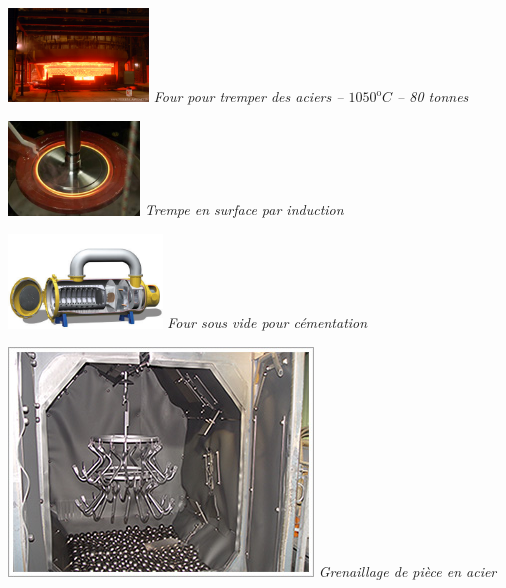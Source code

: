 \documentclass[11pt,oneside]{article}
\begin{document}
\begin{minipage}[c]{.2\linewidth}
\begin{center}
\includegraphics[height=2.5cm]{png/four}
\textit{Four pour tremper des aciers -- $1050^{\text{o}}C$ -- 80 tonnes \cite{four}}
\end{center}
\end{minipage} \hfill
\begin{minipage}[c]{.2\linewidth}
\begin{center}
\includegraphics[height=2.5cm]{png/induction}
\textit{Trempe en surface par induction \cite{induction}}
\end{center}
\end{minipage} \hfill
\begin{minipage}[c]{.2\linewidth}
\begin{center}
\includegraphics[height=2.5cm]{png/cementation}
\textit{Four sous vide pour cémentation \cite{cementation}}
\end{center}
\end{minipage} \hfill
\begin{minipage}[c]{.2\linewidth}
\begin{center}
\includegraphics[width=.9\textwidth]{png/grenaillage}
\textit{Grenaillage de pièce en acier \cite{grenaillage}}
\end{center}
\end{minipage}
\end{document}

